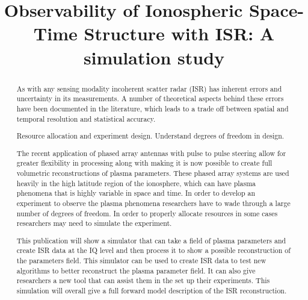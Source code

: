 \documentclass[draft,ras]{agutex}
\begin{document}
%
%


\title{Observability of Ionospheric Space-Time Structure with ISR:   A simulation study }

%
%


\begin{abstract}
As with any sensing modality incoherent scatter radar (ISR) has inherent errors and uncertainty in its measurements. A number of theoretical aspects behind these errors have been documented in the literature, which leads to a trade off between spatial and temporal resolution and statistical accuracy. 

Resource allocation and experiment design. Understand degrees of freedom in design.

The recent application of phased array antennas with pulse to pulse steering allow for greater flexibility in processing along with making it is now possible to create full volumetric reconstructions of plasma parameters. These phased array systems are used heavily in the high latitude region of the ionosphere, which can have plasma phenomena that is highly variable in space and time. In order to develop an experiment to observe the plasma phenomena researchers have to wade through a large number of degrees of freedom. In order to properly allocate resources in some cases researchers may need to simulate the experiment.

This publication will show a simulator that can take a field of plasma parameters and create ISR data at the IQ level and then process it to show a possible reconstruction of the parameters field. This simulator can be used to create ISR data to test new algorithms to better reconstruct the plasma parameter field. It can also give researchers a new tool that can assist them in the set up their experiments. This simulation will overall give a full forward model description of the ISR reconstruction.
\end{abstract}
\end{document}
